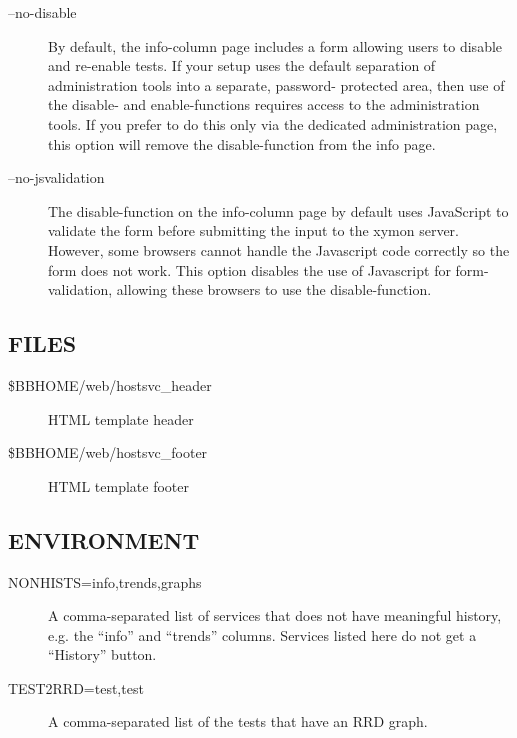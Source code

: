 \begin{description}
 

\item[--no-disable] By default, the info-column page includes a form allowing users to disable and re-enable tests. If your setup uses the default separation of administration tools into a separate, password- protected area, then use of the disable- and enable-functions requires access to the administration tools. If you prefer to do this only via the dedicated administration page, this option will remove the disable-function from the info page. 

 

\item[--no-jsvalidation] The disable-function on the info-column page by default uses JavaScript to validate the form before submitting the input to the xymon server. However, some browsers cannot handle the Javascript code correctly so the form does not work. This option disables the use of Javascript for form-validation, allowing these browsers to use the disable-function. 

 


\end{description}
\subsection{FILES}
\begin{description}
\item[\$BBHOME/web/hostsvc\_header] HTML template header 

 

\item[\$BBHOME/web/hostsvc\_footer] HTML template footer 

 


\end{description}
\subsection{ENVIRONMENT}
\begin{description}
\item[NONHISTS=info,trends,graphs] A comma-separated list of services that does not have meaningful history, e.g. the ``info'' and ``trends'' columns. Services listed here do not get a ``History'' button. 

 

\item[TEST2RRD=test,test] A comma-separated list of the tests that have an RRD graph. 

 


\end{description}
